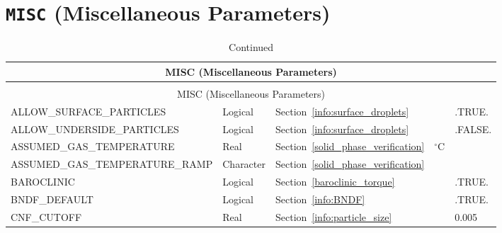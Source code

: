 \documentclass[11pt]{book}
\begin{document}
\vspace{\baselineskip}



\section{\texorpdfstring{{\tt MISC}}{MISC} (Miscellaneous Parameters)}


\begin{longtable}{@{\extracolsep{\fill}}|l|l|l|l|l|}
\caption[Miscellaneous parameters ({\ct MISC} namelist group)]{For more information see Section~\ref{info:MISC}.}
\label{tbl:MISC} \\
\hline
\multicolumn{5}{|c|}{{\ct MISC} (Miscellaneous Parameters)} \\
\hline \hline
\endfirsthead
\caption[]{Continued} \\
\hline
\multicolumn{5}{|c|}{{\ct MISC} (Miscellaneous Parameters)} \\
\hline \hline
\endhead
{\ct \footnotesize ALLOW\_SURFACE\_PARTICLES}   & Logical       & Section~\ref{info:surface_droplets}                   &               & {\ct .TRUE.}    \\ \hline
{\ct \footnotesize ALLOW\_UNDERSIDE\_PARTICLES} & Logical       & Section~\ref{info:surface_droplets}                   &               & {\ct .FALSE.}    \\ \hline
{\ct \footnotesize ASSUMED\_GAS\_TEMPERATURE}   & Real          & Section~\ref{solid_phase_verification}                &   $^\circ$C &                   \\ \hline
{\ct \footnotesize ASSUMED\_GAS\_TEMPERATURE\_RAMP}& Character  & Section~\ref{solid_phase_verification}                &               &                   \\ \hline
{\ct BAROCLINIC}                                & Logical       & Section~\ref{baroclinic_torque}                       &               & {\ct .TRUE.}     \\ \hline
{\ct BNDF\_DEFAULT}                             & Logical       & Section~\ref{info:BNDF}                               &               & {\ct .TRUE.}      \\ \hline
{\ct CNF\_CUTOFF}                               & Real          & Section~\ref{info:particle_size}                      &               & 0.005             \\ \hline

\end{longtable}
\end{document}

